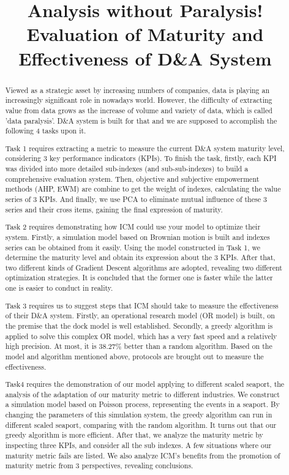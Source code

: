 \documentclass{mcmthesis}
\title{Analysis without Paralysis!\\
Evaluation of Maturity and Effectiveness of D\&A System}
\begin{document}
\begin{abstract}
\noindent
Viewed as a strategic asset by increasing numbers of companies, data is playing an increasingly significant role in nowadays world. However, the difficulty of extracting value from data grows as the  increase of volume and variety of data, which is called 'data paralysis'. D\&A system is built for that and we are supposed to accomplish the following 4 tasks upon it.

\noindent
Task 1 requires extracting a metric to measure the current D\&A system maturity level, considering 3 key performance indicators (KPIs). To finish the task, firstly, each KPI was divided into more detailed sub-indexes (and sub-sub-indexes) to build a comprehensive evaluation system. Then,  objective and subjective empowerment methods (AHP, EWM) are combine to get the weight of indexes, calculating the value series of 3 KPIs. And finally, we use PCA to eliminate mutual influence of these 3 series and their cross items, gaining the final expression of maturity.

\noindent
Task 2 requires demonstrating how ICM could use your model to optimize their system. Firstly, a simulation model based on Brownian motion is built and indexes series can be obtained from it easily. Using the model constructed in Task 1, we determine the maturity level and obtain its expression about the 3 KPIs. After that, two different kinds of Gradient Descent algorithms are adopted, revealing two different optimization strategies. It is concluded that the former one is faster while the latter one is easier to conduct in reality.

\noindent
Task 3 requires us to suggest steps that ICM should take to measure the effectiveness of their D\&A system. Firstly, an operational research model (OR model) is built, on the premise that the dock model is well established. Secondly, a greedy algorithm is applied to solve this complex OR model, which has a very fast speed and a relatively high precision. At most, it is 38.27\% better than a random algorithm. Based on the model and algorithm mentioned above, protocols are brought out to measure the effectiveness.

\noindent
Task4 requires the demonstration of our model applying to different scaled seaport, the analysis of the adaptation of our maturity metric to different industries. We construct a simulation model based on Poisson process, representing the events in a seaport. By changing the parameters of this simulation system, the greedy algorithm can run in different scaled seaport, comparing with the random algorithm. It turns out that our greedy algorithm is more efficient. After that, we analyze the maturity metric by inspecting three KPIs, and consider all the sub indexes. A few situations where our maturity metric fails are listed. We also analyze ICM's benefits from the promotion of maturity metric from 3 perspectives, revealing conclusions.


\end{abstract}
\end{document}
